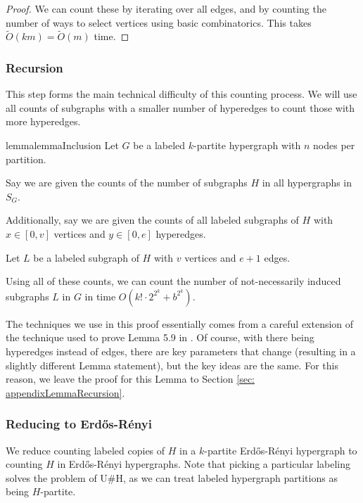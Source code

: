 \documentclass[11pt,letterpaper,pdftex]{article}
\def\Otil{\tilde{O}}
\begin{document}
\begin{proof}
We can count these by iterating over all edges, and by counting the number of ways to select vertices using basic combinatorics. This takes $\Otil(km) =\Otil(m) $ time.
\end{proof}

\subsubsection{Recursion}

This step forms the main technical difficulty of this counting process. We will use all counts of subgraphs with a smaller number of hyperedges to count those with more hyperedges.

\begin{restatable}{lemma}{lemmaInclusion}\label{lem: inclusion}
Let $G$ be a labeled $k$-partite hypergraph with $n$ nodes per partition.

Say we are given the counts of the number of subgraphs $H$ in all hypergraphs in $S_G$.

Additionally, say we are given the counts of all labeled subgraphs of $H$ with $x\in [0,v]$ vertices and $y\in [0,e]$ hyperedges.

Let $L$ be a labeled subgraph of $H$ with $v$ vertices and $e+1$ edges.

Using all of these counts, we can count the number of not-necessarily induced subgraphs $L$ in $G$ in time $O(k!\cdot 2^{2^k} + b^{2^k})$.
\end{restatable}



The techniques we use in this proof essentially comes from a careful extension of the technique used to prove Lemma 5.9 in \cite{factoredProblems}. Of course, with there being hyperedges instead of edges, there are key parameters that change (resulting in a slightly different Lemma statement), but the key ideas are the same. For this reason, we leave the proof for this Lemma to Section \ref{sec: appendixLemmaRecursion}.






\subsubsection{Reducing to Erd{\H{o}}s-R{\'{e}}nyi}
We reduce counting labeled copies of $H$ in a $k$-partite Erd{\H{o}}s-R{\'{e}}nyi hypergraph to counting $H$ in Erd{\H{o}}s-R{\'{e}}nyi hypergraphs. Note that picking a particular labeling solves the problem of U\#H, as we can treat labeled hypergraph partitions as being $H$-partite.
\end{document}
